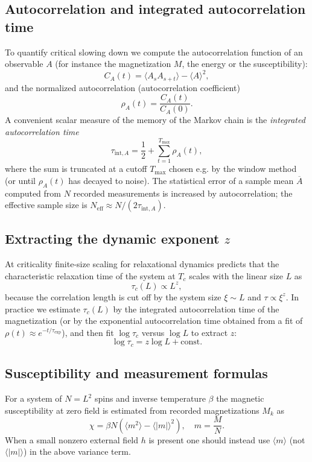 


\subsection{Autocorrelation and integrated autocorrelation time}

To quantify critical slowing down we compute the autocorrelation function of
an observable \(A\) (for instance the magnetization \(M\), the energy or the susceptibility):
\[
C_A(t) = \langle A_{s} A_{s+t}\rangle - \langle A\rangle^2,
\]
and the normalized autocorrelation (autocorrelation coefficient)
\[
\rho_A(t) = \frac{C_A(t)}{C_A(0)}.
\]
A convenient scalar measure of the memory of the Markov chain is the
\emph{integrated autocorrelation time}
\[
\tau_{\mathrm{int},A} = \frac{1}{2} + \sum_{t=1}^{T_{\max}} \rho_A(t),
\]
where the sum is truncated at a cutoff \(T_{\max}\) chosen e.g. by the window
method (or until \(\rho_A(t)\) has decayed to noise). The statistical error
of a sample mean \(\overline{A}\) computed from \(N\) recorded measurements
is increased by autocorrelation; the effective sample size is \(N_\text{eff}\approx N/(2\tau_{\mathrm{int},A})\).


\subsection{Extracting the dynamic exponent \(z\)}

At criticality finite-size scaling for relaxational dynamics predicts that
the characteristic relaxation time of the system at \(T_c\) scales with the
linear size \(L\) as
\[
\tau_c(L) \propto L^{z},
\]
because the correlation length is cut off by the system size \(\xi\sim L\)
and \(\tau\propto\xi^{z}\). In practice we estimate \(\tau_c(L)\) by the
integrated autocorrelation time of the magnetization (or by the exponential
autocorrelation time obtained from a fit of \(\rho(t)\approx e^{-t/\tau_{\exp}}\)),
and then fit \(\log \tau_c\) versus \(\log L\) to extract \(z\):
\[
\log \tau_c = z \log L + \text{const}.
\]


\subsection{Susceptibility and measurement formulas}

For a system of \(N=L^2\) spins and inverse temperature \(\beta\) the
magnetic susceptibility at zero field is estimated from recorded
magnetizations \(M_k\) as
\[
\chi = \beta N \left(\langle m^2\rangle - \langle |m|\rangle^2\right),
\quad m=\frac{M}{N}.
\]
When a small nonzero external field \(h\) is present one should instead use
\(\langle m\rangle\) (not \(\langle |m|\rangle\)) in the above variance term.

